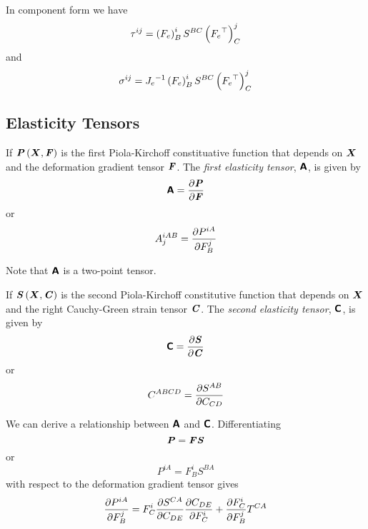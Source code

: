 In component form we have
\begin{equation}
  \tau^{ij}=\left( F_{e} \right)^{i}_{B}S^{BC}\left(  {F_{e}}^{ \top }  \right)^{j}_{C}
\end{equation}
and
\begin{equation}
  \sigma^{ij}={J_{e}}^{-1}\left( F_{e} \right)^{i}_{B}S^{BC}\left(  {F_{e}}^{ \top }  \right)^{j}_{C}
\end{equation}

\subsection{Elasticity Tensors}

If $ \boldsymbol{\mathit{P}}\left(  \boldsymbol{X} ,\boldsymbol{\mathit{F}} \right) $ is the first Piola-Kirchoff
constituative function that depends on $ \boldsymbol{X} $ and the deformation
gradient tensor $\boldsymbol{\mathit{F}}$. The \emph{first elasticity tensor},
$\boldsymbol{\mathsf{A}}$, is given by 
\begin{equation}
  \boldsymbol{\mathsf{A}}= \dfrac{\partial \boldsymbol{\mathit{P}}}{\partial \boldsymbol{\mathit{F}}} 
\end{equation}
or
\begin{equation}
  A^{iAB}_{j}= \dfrac{\partial P^{iA}}{\partial F^{j}_{B}} 
\end{equation}

Note that $\boldsymbol{\mathsf{A}}$ is a two-point tensor. 

If $ \boldsymbol{\mathit{S}}\left(  \boldsymbol{X} ,\boldsymbol{\mathit{C}} \right) $ is the second Piola-Kirchoff
constitutive function that depends on $ \boldsymbol{X} $ and the right Cauchy-Green
strain tensor $\boldsymbol{\mathit{C}}$. The \emph{second elasticity tensor},
$\boldsymbol{\mathsf{C}}$, is given by 
\begin{equation}
  \boldsymbol{\mathsf{C}}= \dfrac{\partial \boldsymbol{\mathit{S}}}{\partial \boldsymbol{\mathit{C}}} 
\end{equation}
or
\begin{equation}
  C^{ABCD}= \dfrac{\partial S^{AB}}{\partial C_{CD}} 
\end{equation}

We can derive a relationship between $\boldsymbol{\mathsf{A}}$ and $\boldsymbol{\mathsf{C}}$. Differentiating
\begin{equation}
  \boldsymbol{\mathit{P}}=\boldsymbol{\mathit{F}}\boldsymbol{\mathit{S}}
\end{equation}
or
\begin{equation}
  P^{iA}=F^{i}_{B}S^{BA}
\end{equation}
with respect to the deformation gradient tensor gives
\begin{equation}
   \dfrac{\partial P^{iA}}{\partial F^{j}_{B}} =F^{i}_{C} \dfrac{\partial S^{CA}}{\partial C_{DE}}  \dfrac{\partial C_{DE}}{\partial F^{i}_{C}} + \dfrac{\partial F^{i}_{C}}{\partial F^{j}_{B}} T^{CA}
\end{equation}

